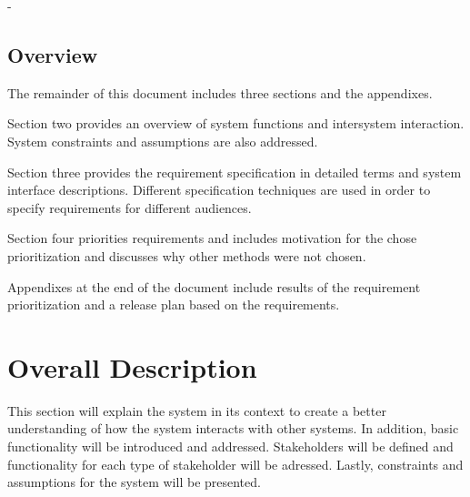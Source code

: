 -\documentclass[compsoc,draftclsnofoot,onecolumn,10pt]{IEEEtran}
\begin{document}




\subsection{Overview} %
The remainder of this document includes three sections and the appendixes. \par
Section two provides an overview of system functions and intersystem interaction. 
System constraints and assumptions are also addressed. \par
Section three provides the requirement specification in detailed terms and system interface descriptions. Different specification techniques are used in order to specify requirements for different audiences. \par
Section four priorities requirements and includes motivation for the chose prioritization and discusses why other methods were not chosen. \par
Appendixes at the end of the document include results of the requirement prioritization and a release plan based on the requirements. \cite{IEEE830}

\section{Overall Description} %
This section will explain the system in its context to create a better understanding of how the system interacts with other systems.
In addition, basic functionality will be introduced and addressed. 
Stakeholders will be defined and functionality for each type of stakeholder will be adressed. 
Lastly, constraints and assumptions for the system will be presented. 

\end{document}
